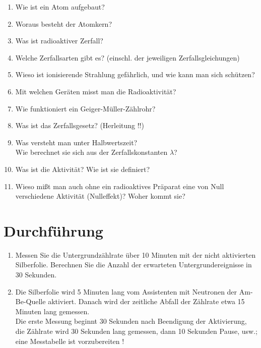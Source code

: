 \begin{enumerate}
	\item Wie ist ein Atom aufgebaut?
	\item Woraus besteht der Atomkern?
	\item Was ist radioaktiver Zerfall?
	\item Welche Zerfallsarten gibt es? (einschl. der jeweiligen Zerfallsgleichungen)
	\item Wieso ist ionisierende Strahlung gefährlich, und wie kann man sich schützen?
	\item Mit welchen Geräten misst man die Radioaktivität?
	\item Wie funktioniert ein Geiger-Müller-Zählrohr?
	\item Was ist das Zerfallsgesetz? (Herleitung !!)
	\item Was versteht man unter Halbwertszeit? \\
		Wie berechnet sie sich aus der Zerfallskonstanten $\lambda$?
	\item Was ist die Aktivität? Wie ist sie definiert?
	\item Wieso mißt man auch ohne ein radioaktives Präparat eine von Null verschiedene Aktivität (Nulleffekt)? Woher kommt sie?
\end{enumerate}

\section{Durchführung} 

\begin{enumerate}
	\item Messen Sie die Untergrundzählrate über 10 Minuten mit der nicht aktivierten Silberfolie. Berechnen Sie die Anzahl der erwarteten Untergrundereignisse in 30 Sekunden.
	\item Die Silberfolie wird 5 Minuten lang vom Assistenten mit Neutronen der Am-Be-Quelle aktiviert. Danach wird der zeitliche Abfall der Zählrate etwa 15 Minuten lang gemessen.\\
	Die erste Messung beginnt 30 Sekunden nach Beendigung der Aktivierung, die Zählrate wird 30 Sekunden lang gemessen, dann 10 Sekunden Pause, usw.; eine Messtabelle ist vorzubereiten !
\end{enumerate}

